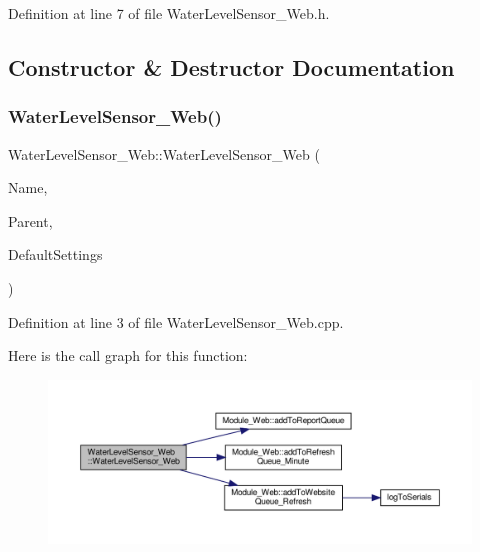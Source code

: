 Definition at line 7 of file Water\+Level\+Sensor\+\_\+\+Web.\+h.



\subsection{Constructor \& Destructor Documentation}
\mbox{\label{class_water_level_sensor___web_a822380f4ecf477d16e6d535edff71848}} 
\subsubsection{\texorpdfstring{Water\+Level\+Sensor\+\_\+\+Web()}{WaterLevelSensor\_Web()}}
{\footnotesize\ttfamily Water\+Level\+Sensor\+\_\+\+Web\+::\+Water\+Level\+Sensor\+\_\+\+Web (\begin{DoxyParamCaption}\item[{const \+\_\+\+\_\+\+Flash\+String\+Helper $\ast$}]{Name,  }\item[{\hyperlink{class_module___web}{Module\+\_\+\+Web} $\ast$}]{Parent,  }\item[{\hyperlink{struct_settings_1_1_water_level_sensor_settings}{Settings\+::\+Water\+Level\+Sensor\+Settings} $\ast$}]{Default\+Settings }\end{DoxyParamCaption})}



Definition at line 3 of file Water\+Level\+Sensor\+\_\+\+Web.\+cpp.

Here is the call graph for this function\+:
\nopagebreak
\begin{figure}[H]
\begin{center}
\leavevmode
\includegraphics[width=350pt]{class_water_level_sensor___web_a822380f4ecf477d16e6d535edff71848_cgraph}
\end{center}
\end{figure}


